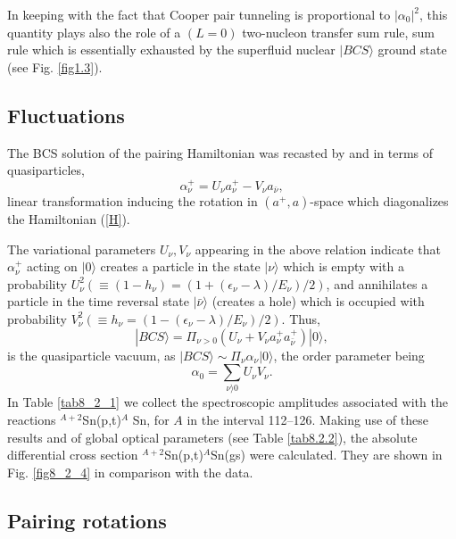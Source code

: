 In keeping with the fact that Cooper pair tunneling is proportional to $|\alpha_0|^2$, this quantity plays also the
role of a $(L=0)$ two-nucleon
transfer sum rule, sum rule which is essentially exhausted by the superfluid nuclear $|BCS\rangle$ ground state (see Fig. \ref{fig1.3}). 
\subsection{Fluctuations}
The BCS solution of the pairing Hamiltonian was recasted by  \cite{Bogoljubov:58} and  \cite{Valatin:58} in terms of quasiparticles, 
\begin{equation}\label{eq8.2.9}
\alpha^+_{\nu} = U_{\nu} a^+_{\nu} - V_{\nu} a_{\bar \nu},
\end{equation}
linear transformation inducing the rotation in  $(a^+,a)$-space which diagonalizes  the Hamiltonian (\ref{H}).

The variational parameters $U_{\nu},V_{\nu}$ appearing in the above
relation indicate that $\alpha^+_{\nu}$ acting on $|0\rangle$ creates a particle 
in the state $|\nu\rangle$ which is empty with a probability $U^2_{\nu} (\equiv (1 -h_{\nu})=(1+(\epsilon_\nu-\lambda)/E_\nu)/2)$, and annihilates a particle in the time reversal state $|\bar \nu\rangle$
(creates a hole) which is occupied with probability $V_{\nu}^2 (\equiv h_{\nu}=(1-(\epsilon_\nu-\lambda)/E_\nu)/2)$. Thus, 
\begin{equation}\label{eq8.2.10}
|BCS\rangle = \Pi_{\nu>0} (U_{\nu} +V_{\nu} a^+_{\nu}a^+_{\bar \nu}) |0\rangle,
\end{equation}
is the quasiparticle vacuum, as $|BCS\rangle \sim \Pi_{\nu} \alpha_{\nu} |0\rangle$, the order parameter being 
\begin{equation}
\alpha_0 = \sum_{\nu\rangle 0} U_{\nu}V_{\nu}.
\label{UV}
\end{equation}
In Table \ref{tab8_2_1} we collect the spectroscopic amplitudes associated with  the reactions  
$^{A+2}$Sn(p,t)$^A$ Sn, for $A$ in the interval 112--126. Making use of these results and of  global optical parameters (see Table \ref{tab8.2.2}), the absolute differential cross section $^{A+2}$Sn(p,t)$^A$Sn(gs) were calculated. They are shown in Fig. \ref{fig8_2_4} in comparison with the data.
\subsection{Pairing rotations}

